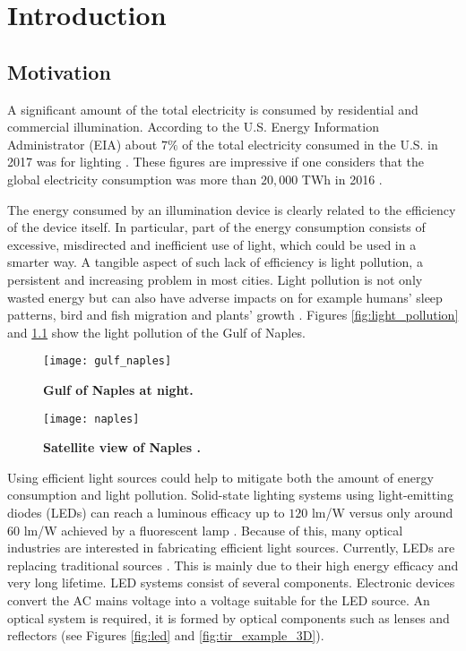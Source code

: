 \chapter{Introduction}
\section{Motivation}
A significant amount of the total electricity is consumed by residential and commercial illumination.
According to the U.S. Energy Information Administrator (EIA) about $7\%$ of the total electricity consumed in the U.S. in 2017 was for lighting \cite{electricity_light}. These figures are impressive if one considers that the global electricity consumption was more than $20,000$ TWh in 2016 \cite{statistic}. 

The energy consumed by an illumination device is clearly related to the efficiency of the device itself. 
In particular, part of the energy consumption consists of excessive, misdirected and inefficient use of light, which could be used in a smarter way. A tangible aspect of such lack of efficiency is light pollution, a persistent and increasing problem in most cities. Light pollution is not only wasted energy but can also have adverse impacts on for example humans’ sleep patterns, bird and fish migration and plants’ growth \cite{bergesen2016potential}. Figures \ref{fig:light_pollution} and \ref{fig:light_pollution2} show the light pollution of the Gulf of Naples.
\begin{figure}[t]
  \begin{minipage}[t]{0.49\textwidth}
    \texttt{[image: gulf\_naples]}
    \caption{\textbf{Gulf of Naples at night.}}
    \label{fig:light_pollution}
\end{minipage}
\hfill
 \begin{minipage}[t]{ 0.49\textwidth}
    \texttt{[image: naples]}
    \caption{\textbf{Satellite view of Naples \cite{nasa_image}.}}
    \label{fig:light_pollution2}
\end{minipage}
  \end{figure}

Using efficient light sources could help to mitigate both the amount of energy consumption and light pollution. %
Solid-state lighting systems using light-emitting diodes (LEDs) can reach a luminous efficacy up to $120$ \textrm{lm}/\textrm{W} versus only around $60$ \textrm{lm}/\textrm{W} achieved by a fluorescent lamp \cite{bergesen2016potential, humphreys2008solid}.
Because of this, many optical industries are interested in fabricating efficient light sources.
Currently, LEDs are replacing traditional sources \cite{koshel2012illumination}. 
This is mainly due to their high energy efficacy and very long lifetime. 
LED systems consist of several components. 
Electronic devices convert the AC mains voltage into a voltage suitable for the LED source.
An optical system is required, it is formed by optical components such as lenses and reflectors \cite{moreno2008modeling} (see Figures \ref{fig:led} and \ref{fig:tir_example_3D}).

